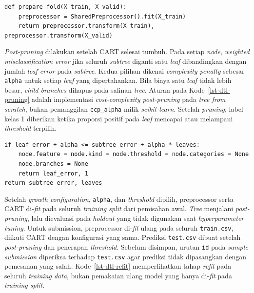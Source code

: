 \begin{lstlisting}[caption={Preprocessing yang di-fit ulang pada setiap fold},label={lst-dtl-fold}]
def prepare_fold(X_train, X_valid):
    preprocessor = SharedPreprocessor().fit(X_train)
    return preprocessor.transform(X_train), preprocessor.transform(X_valid)
\end{lstlisting}

\textit{Post-pruning} dilakukan setelah CART selesai tumbuh. Pada setiap \textit{node}, \textit{weighted misclassification error} jika seluruh \textit{subtree} diganti satu \textit{leaf} dibandingkan dengan jumlah \textit{leaf error} pada \textit{subtree}. Kedua pilihan dikenai \textit{complexity penalty} sebesar \texttt{alpha} untuk setiap \textit{leaf} yang dipertahankan. Bila biaya satu \textit{leaf} tidak lebih besar, \textit{child branches} dihapus pada salinan \textit{tree}. Aturan pada Kode~\ref{lst-dtl-pruning} adalah implementasi \textit{cost-complexity post-pruning} pada \textit{tree from scratch}, bukan pemanggilan \texttt{ccp\_alpha} milik \textit{scikit-learn}. Setelah \textit{pruning}, label kelas 1 diberikan ketika proporsi positif pada \textit{leaf} mencapai atau melampaui \textit{threshold} terpilih.

\begin{lstlisting}[caption={Keputusan cost-complexity post-pruning pada node CART},label={lst-dtl-pruning}]
if leaf_error + alpha <= subtree_error + alpha * leaves:
    node.feature = node.kind = node.threshold = node.categories = None
    node.branches = None
    return leaf_error, 1
return subtree_error, leaves
\end{lstlisting}

Setelah \textit{growth configuration}, \texttt{alpha}, dan \textit{threshold} dipilih, preprocessor serta CART di-\textit{fit} pada seluruh \textit{training split} dari pemisahan awal. \textit{Tree} menjalani \textit{post-pruning}, lalu dievaluasi pada \textit{holdout} yang tidak digunakan saat \textit{hyperparameter tuning}. Untuk submission, preprocessor di-\textit{fit} ulang pada seluruh \texttt{train.csv}, diikuti CART dengan konfigurasi yang sama. Prediksi \texttt{test.csv} dibuat setelah \textit{post-pruning} dan penerapan \textit{threshold}. Sebelum disimpan, urutan \texttt{id} pada \textit{sample submission} diperiksa terhadap \texttt{test.csv} agar prediksi tidak dipasangkan dengan pemesanan yang salah. Kode~\ref{lst-dtl-refit} memperlihatkan tahap \textit{refit} pada seluruh \textit{training data}, bukan pemakaian ulang model yang hanya di-\textit{fit} pada \textit{training split}.

